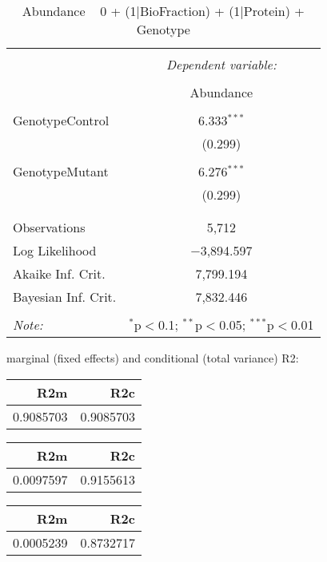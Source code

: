 \documentclass[11pt]{report}
\begin{document}
\begin{table}[!htbp] \centering 
  \caption{Abundance ~ 0 + (1|BioFraction) + (1|Protein) + Genotype} 
  \label{} 
\begin{tabular}{@{\extracolsep{5pt}}lc} 
\\[-1.8ex]\hline 
\hline \\[-1.8ex] 
 & \multicolumn{1}{c}{\textit{Dependent variable:}} \\ 
\cline{2-2} 
\\[-1.8ex] & Abundance \\ 
\hline \\[-1.8ex] 
 GenotypeControl & 6.333$^{***}$ \\ 
  & (0.299) \\ 
  & \\ 
 GenotypeMutant & 6.276$^{***}$ \\ 
  & (0.299) \\ 
  & \\ 
\hline \\[-1.8ex] 
Observations & 5,712 \\ 
Log Likelihood & $-$3,894.597 \\ 
Akaike Inf. Crit. & 7,799.194 \\ 
Bayesian Inf. Crit. & 7,832.446 \\ 
\hline 
\hline \\[-1.8ex] 
\textit{Note:}  & \multicolumn{1}{r}{$^{*}$p$<$0.1; $^{**}$p$<$0.05; $^{***}$p$<$0.01} \\ 
\end{tabular} 
\end{table} 
marginal (fixed effects) and conditional (total variance) R2:

\begin{tabular}{r|r}
\hline
R2m & R2c\\
\hline
0.9085703 & 0.9085703\\
\hline
\end{tabular}

\begin{tabular}{r|r}
\hline
R2m & R2c\\
\hline
0.0097597 & 0.9155613\\
\hline
\end{tabular}

\begin{tabular}{r|r}
\hline
R2m & R2c\\
\hline
0.0005239 & 0.8732717\\
\hline
\end{tabular}
\end{document}
